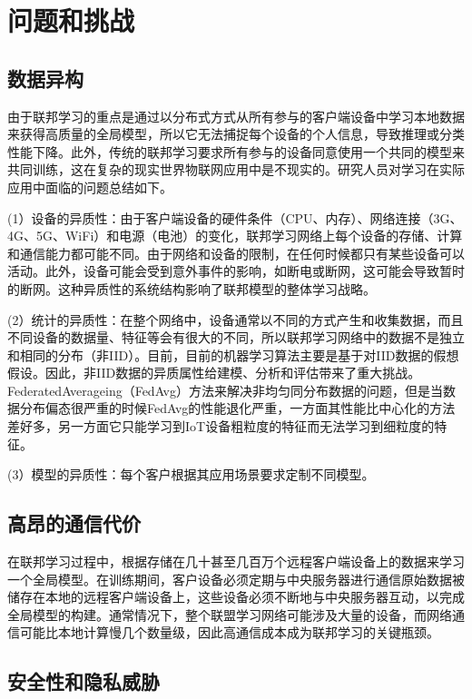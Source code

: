 \section {问题和挑战}


\subsection{数据异构}
由于联邦学习的重点是通过以分布式方式从所有参与的客户端设备中学习本地数据来获得高质量的全局模型，所以它无法捕捉每个设备的个人信息，导致推理或分类性能下降。此外，传统的联邦学习要求所有参与的设备同意使用一个共同的模型来共同训练，这在复杂的现实世界物联网应用中是不现实的。研究人员对学习在实际应用中面临的问题总结如下。

(1）设备的异质性：由于客户端设备的硬件条件（CPU、内存）、网络连接（3G、4G、5G、WiFi）和电源（电池）的变化，联邦学习网络上每个设备的存储、计算和通信能力都可能不同。由于网络和设备的限制，在任何时候都只有某些设备可以活动。此外，设备可能会受到意外事件的影响，如断电或断网，这可能会导致暂时的断网。这种异质性的系统结构影响了联邦模型的整体学习战略。

(2）统计的异质性：在整个网络中，设备通常以不同的方式产生和收集数据，而且不同设备的数据量、特征等会有很大的不同，所以联邦学习网络中的数据不是独立和相同的分布（非IID）。目前，目前的机器学习算法主要是基于对IID数据的假想假设。因此，非IID数据的异质属性给建模、分析和评估带来了重大挑战。FederatedAverageing（FedAvg）方法来解决非均匀同分布数据的问题，但是当数据分布偏态很严重的时候FedAvg的性能退化严重，一方面其性能比中心化的方法差好多，另一方面它只能学习到IoT设备粗粒度的特征而无法学习到细粒度的特征。

(3）模型的异质性：每个客户根据其应用场景要求定制不同模型。

\subsection{高昂的通信代价}
在联邦学习过程中，根据存储在几十甚至几百万个远程客户端设备上的数据来学习一个全局模型。在训练期间，客户设备必须定期与中央服务器进行通信原始数据被储存在本地的远程客户端设备上，这些设备必须不断地与中央服务器互动，以完成全局模型的构建。通常情况下，整个联盟学习网络可能涉及大量的设备，而网络通信可能比本地计算慢几个数量级，因此高通信成本成为联邦学习的关键瓶颈。

\subsection{安全性和隐私威胁}

